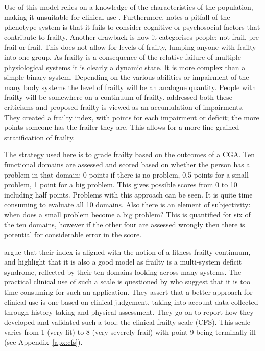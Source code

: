 \documentclass
[
	12pt,
	a4paper,
	oneside,
]{report}
\begin{document}
Use of this model relies on a knowledge of the characteristics of the population,
making it unsuitable for clinical use \parencite{ensrud:08}.
Furthermore, \textcite{martin:08} notes a pitfall of the phenotype system is 
that it fails to
consider cognitive or psychosocial factors that contribute to frailty.
Another drawback is how it categorises people: not frail,
pre-frail or frail. This does not allow for levels of frailty, lumping anyone with
frailty into one group. As frailty is a consequence of the relative failure of
multiple physiological systems it is clearly a dynamic state. It is more complex
than a simple binary system. Depending on the various abilities or impairment of
the many body systems the level of frailty will be an analogue quantity. People
with frailty will be somewhere on a continuum of frailty. \textcite{jones:05} 
addressed both these criticisms and proposed frailty is viewed as an accumulation of
impairments. They created a frailty index, with points for each impairment or
deficit; the more points someone has the frailer they are. This allows for a more 
fine grained stratification of frailty.

The strategy used here is to grade frailty based on the outcomes of a CGA. Ten
functional domains are assessed and scored based on whether the person has a
problem in that domain: 0 points if there is no problem, 0.5 points for a small
problem, 1 point for a big problem. This gives possible scores from 0 to 10 
including half points. Problems with this approach can be seen. It is quite
time consuming to evaluate all 10 domains. Also there is an element of 
subjectivity: when does a small problem become a big problem? This is quantified
for six of the ten domains, however if the other four are assessed
wrongly then there is potential for considerable error in the score. 

\textcite{jones:05} argue that their index is aligned with the notion of a 
fitness-frailty continuum, and highlight that it is also a good model as frailty
is a multi-system deficit syndrome, reflected by their ten domains looking
across many systems. The practical clinical use of such a scale is questioned
by \textcite{rockwood:05} who suggest that it is too time consuming for such an
application. They assert that a better approach for clinical use is one based
on clinical judgement, taking into account data collected through history taking
and physical assessment. They go on to report how they developed and validated
such a tool: the clinical frailty scale (CFS). This scale varies from 1 (very fit)
to 8 (very severely frail) with point 9 being terminally ill 
(see Appendix~\ref{apx:cfs}).
\end{document}
